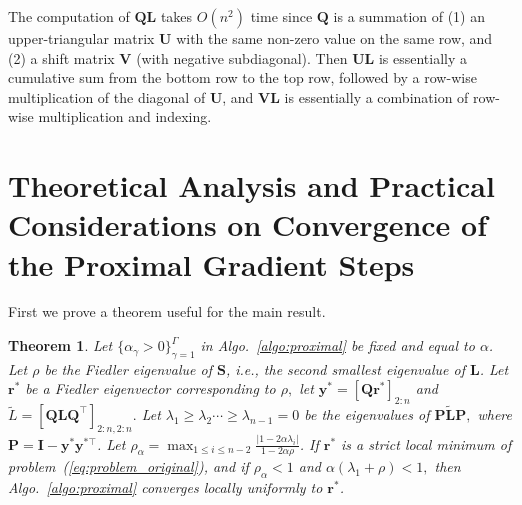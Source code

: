 \documentclass[nohyperref]{article}
\theoremstyle{plain}
\newtheorem{theorem}{Theorem}[section]
\theoremstyle{definition}
\theoremstyle{remark}
\begin{document}
The computation of $\mathbf{Q} \mathbf{L}$ takes $O(n^2)$ time since $\mathbf{Q}$ is a summation of (1) an upper-triangular matrix $\mathbf{U}$ with the same non-zero value on the same row, and (2) a shift matrix $\mathbf{V}$ (with negative subdiagonal). Then
$\mathbf{U} \mathbf{L}$ is essentially a cumulative sum from the bottom row to the top row, followed by a row-wise multiplication of the diagonal of $\mathbf{U}$, and 
$\mathbf{V} \mathbf{L}$ is essentially a combination of row-wise multiplication and indexing.

\section{Theoretical Analysis and Practical Considerations on Convergence of the Proximal Gradient Steps}
\label{appendix_sec:convergence_dis} 
First we prove a theorem useful for the main result.
\begin{theorem}
\label{thm:convergence_appendix}
Let $\{\alpha_\gamma>0\}_{\gamma=1}^\Gamma$ in Algo.~\ref{algo:proximal} be fixed and equal to $\alpha$. Let $\rho$ be the Fiedler eigenvalue of $\mathbf{S}$, i.e., the second smallest eigenvalue of $\mathbf{L}$.  Let $\mathbf{r}^*$ be a Fiedler eigenvector corresponding to $\rho,$ let  $\mathbf{y}^*=\left[\mathbf{Q}\mathbf{r}^*\right]_{2:n}$ and $\widetilde{L} = \left[\mathbf{Q L Q}^\top\right]_{2:n,2:n}.$ 
Let $\lambda_1 \geq \lambda_2 \cdots \geq \lambda_{n-1}=0$ be the eigenvalues of $ \mathbf{P}\widetilde{\mathbf{L}}\mathbf{P},$ where $\mathbf{P}=\mathbf{I}-\mathbf{y}^*\mathbf{y}^{*\top}$.
Let $\rho_\alpha=\max_{1\leq i \leq n-2}\frac{|1-2\alpha\lambda_i|}{1-2\alpha\rho}$. If $\mathbf{r}^*$ is a strict local minimum of problem~(\ref{eq:problem_original}), and if $\rho_\alpha<1$ and $\alpha(\lambda_1+\rho)<1,$ then Algo.~\ref{algo:proximal} converges locally uniformly to  $\mathbf{r}^*$.
\end{theorem} 
\end{document}
